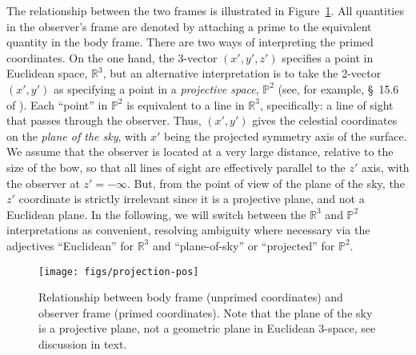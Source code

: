 \documentclass[useAMS, usenatbib, a4paper]{mnras}
\begin{document}
The relationship between the two frames is illustrated in
Figure~\ref{fig:projection-pos}.  All quantities in the observer's
frame are denoted by attaching a prime to the equivalent quantity in
the body frame. There are two ways of interpreting the primed
coordinates. On the one hand, the 3-vector \((x', y', z')\) specifies
a point in Euclidean space, \(\mathds{R}^3\), but an alternative
interpretation is to take the 2-vector \((x', y')\) as specifying a
point in a \textit{projective space}, \(\mathds{P}^2\) (see, for
example, \S~15.6 of \citealp{Penrose:2004a}). Each ``point'' in
\(\mathds{P}^2\) is equivalent to a line in \(\mathds{R}^3\),
specifically: a line of sight that passes through the observer. Thus,
\((x', y')\) gives the celestial coordinates on the \textit{plane of
  the sky}, with \(x'\) being the projected symmetry axis of the
surface.  We assume that the observer is located at a very large
distance, relative to the size of the bow, so that all lines of sight
are effectively parallel to the \(z'\) axis, with the observer at
\(z' = -\infty\).  But, from the point of view of the plane of the sky, the
\(z'\) coordinate is strictly irrelevant since it is a projective
plane, and not a Euclidean plane.  In the following, we will switch
between the \(\mathds{R}^3\) and \(\mathds{P}^2\) interpretations as
convenient, resolving ambiguity where necessary via the adjectives
``Euclidean'' for \(\mathds{R}^3\) and ``plane-of-sky'' or
``projected'' for \(\mathds{P}^2\).



\begin{figure}
  \centering
  \texttt{[image: figs/projection-pos]}
  \caption{Relationship between body frame (unprimed coordinates) and
    observer frame (primed coordinates).  Note that the plane of the
    sky is a projective plane, not a geometric plane in Euclidean
    3-space, see discussion in text.}
  \label{fig:projection-pos}
\end{figure}
\end{document}

